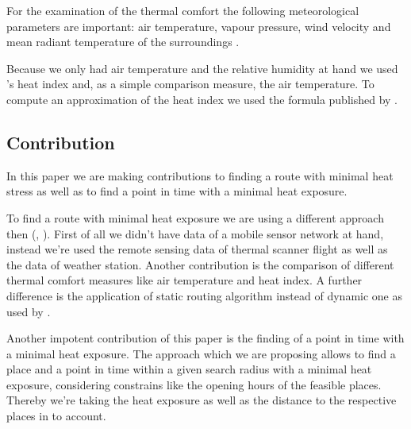 For the examination of the thermal comfort the following meteorological parameters are important: air temperature, vapour pressure,
wind velocity and mean radiant temperature of the surroundings \parencite{Matzarakis1999}.

Because we only had air temperature and the relative humidity at hand we used \citeauthor{Steadman1979}'s heat index \parencite{Steadman1979} and, as a simple comparison measure, the air temperature. To compute an approximation of the heat index we used the formula published by \textcite[77]{Stull2011}. 


\subsection{Contribution}

In this paper we are making contributions to finding a route with minimal heat stress as well as to find a point in time with a minimal heat exposure. 

To find a route with minimal heat exposure we are using a different approach then \citeauthor{Dang2012} (\citeyear{Dang2012}, \citeyear{Dang2013}). First of all we didn't have data of a mobile sensor network at hand, instead we're used the remote sensing data of thermal scanner flight as well as the data of weather station. Another contribution is the comparison of different thermal comfort measures like air temperature and heat index. A further difference is the application of static routing algorithm instead of dynamic one as used by \citeauthor{Dang2012}.

Another impotent contribution of this paper is the finding of a point in time with a minimal heat exposure. The approach which we are proposing allows to find a place and a point in time within a given search radius with a minimal heat exposure, considering constrains like the opening hours of the feasible places. Thereby we're taking the heat exposure as well as the distance to the respective places in to account.   



